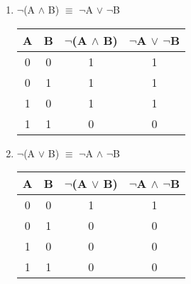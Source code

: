 \documentclass{report}
\begin{document}
\begin{enumerate}

  \item $\neg$(A $\land$ B) $\equiv$ $\neg$A $\lor$ $\neg$B

\begin{center}
  \begin{tabular}{| c | c | c | c |}
    \hline
    A & B & $\neg$(A $\land$ B) & $\neg$A $\lor$ $\neg$B \\ \hline
    0 & 0 & 1 & 1 \\
    0 & 1 & 1 & 1 \\ 
    1 & 0 & 1 & 1 \\
    1 & 1 & 0 & 0 \\ \hline
  \end{tabular}
\end{center}

  \item $\neg$(A $\lor$ B) $\equiv$ $\neg$A $\land$ $\neg$B

\begin{center}
  \begin{tabular}{| c | c | c | c |}
    \hline
    A & B & $\neg$(A $\lor$ B) & $\neg$A $\land$ $\neg$B \\ \hline
    0 & 0 & 1 & 1 \\
    0 & 1 & 0 & 0 \\ 
    1 & 0 & 0 & 0 \\
    1 & 1 & 0 & 0 \\ \hline
  \end{tabular}
\end{center}
\end{enumerate}
\end{document}
